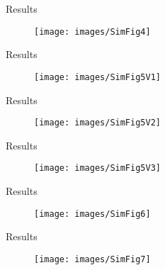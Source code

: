 \documentclass{beamer}
\begin{document}
\begin{frame}{Results}
		\begin{figure}
		\centering
		\texttt{[image: images/SimFig4]}
	\end{figure}
\end{frame}

\begin{frame}{Results}
\begin{figure}
	\centering
	\texttt{[image: images/SimFig5V1]}
\end{figure}
\end{frame}

\begin{frame}{Results}
\begin{figure}
	\centering
	\texttt{[image: images/SimFig5V2]}
\end{figure}
\end{frame}
\begin{frame}{Results}
	\begin{figure}
		\centering
		\texttt{[image: images/SimFig5V3]}
	\end{figure}
\end{frame}

\begin{frame}{Results}
	\begin{figure}
		\centering
		\texttt{[image: images/SimFig6]}
	\end{figure}
\end{frame}

\begin{frame}{Results}
	\begin{figure}
		\centering
		\texttt{[image: images/SimFig7]}
	\end{figure}
\end{frame}
\end{document}
